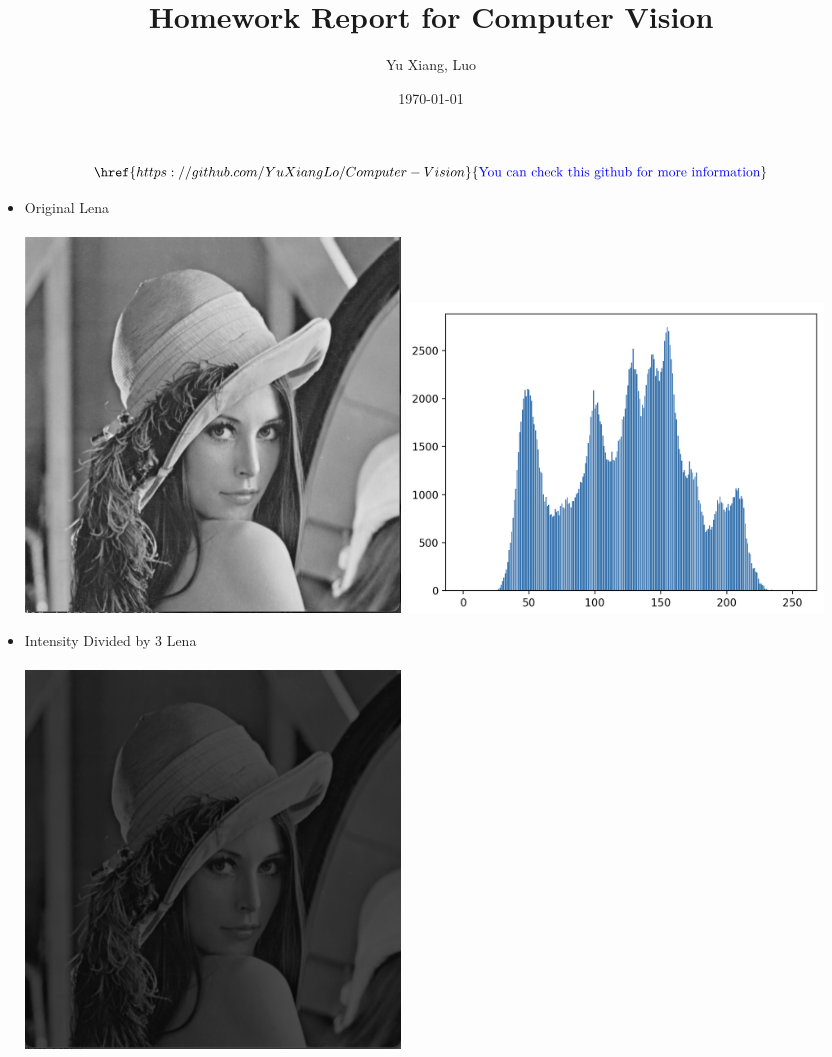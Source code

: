 \documentclass[12pt,a4paper]{article}
\title{Homework Report for Computer Vision}
\author{Yu Xiang, Luo}
\date{\today}
\begin{document}
\maketitle

\[
	\href{https://github.com/YuXiangLo/Computer-Vision}{\text{\textcolor{blue}{You can check this github for more information}}}
\]

\begin{itemize}
	\item Original Lena\\ 
		\\
		\includegraphics[width=0.45\textwidth]{./img/original_lena.png}
		\includegraphics[width=0.5\textwidth]{./img/original.png}
	\item Intensity Divided by 3 Lena\\
		\\
		\includegraphics[width=0.45\textwidth]{./img/divide_3_lena.png}

\end{itemize}
\end{document}
